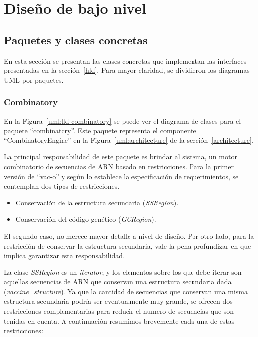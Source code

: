 \section{Dise\~no de bajo nivel}
\label{lld}  
  \subsection{Paquetes y clases concretas}
  En esta secci\'on se presentan las clases concretas que implementan las
interfaces presentadas en la secci\'on~\ref{hld}. Para mayor claridad, se
dividieron los diagramas UML por paquetes.

  \subsubsection{Combinatory}
  En la Figura~\ref{uml:lld-combinatory} se puede ver el diagrama de clases
para el paquete ``combinatory''. Este paquete representa el componente
``CombinatoryEngine'' en la Figura~\ref{uml:architecture} de la
secci\'on~\ref{architecture}.

  La principal responsabilidad de este paquete es brindar al sistema, un motor
combinatorio de secuencias de ARN basado en restricciones. Para la primer
versi\'on de ``vac-o'' y seg\'un lo establece la especificaci\'on de
requerimientos, se contemplan dos tipos de restricciones.
  \begin{itemize}
   \item Conservaci\'on de la estructura secundaria (\textit{SSRegion}).
   \item Conservaci\'on del c\'odigo gen\'etico (\textit{GCRegion}).
  \end{itemize}

  El segundo caso, no merece mayor detalle a nivel de dise\~no. Por otro lado,
para la restricci\'on de conservar la estructura secundaria, vale la pena
profundizar en que implica garantizar esta responsabilidad.

  La clase \textit{SSRegion} es un \textit{iterator}, y los elementos sobre los
que debe iterar son aquellas secuencias de ARN que conservan una estructura
secundaria dada (\textit{vaccine\_structure}). Ya que la cantidad de secuencias
que conservan una misma estructura secundaria podr\'ia ser eventualmente muy
grande, se ofrecen dos restricciones complementarias para reducir el numero de
secuencias que son tenidas en cuenta. A continuaci\'on resumimos brevemente cada
una de estas restricciones:

